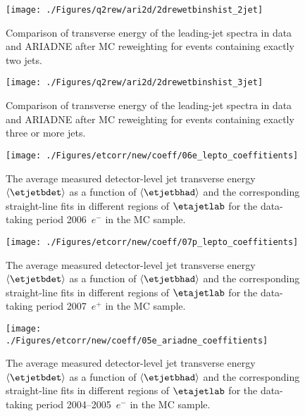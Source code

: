 \begin{figure}[p]%
\texttt{[image: ./Figures/q2rew/ari2d/2drewetbinshist\_2jet]}%
\caption{Comparison of transverse energy of the leading-jet spectra in data
and ARIADNE after MC reweighting for events containing exactly two jets.}%
\label{fig:2dq2rew_et_2jet}%
\end{figure}

\begin{figure}[p]%
\texttt{[image: ./Figures/q2rew/ari2d/2drewetbinshist\_3jet]}%
\caption{Comparison of transverse energy of the leading-jet spectra in data
and ARIADNE after MC reweighting for events containing exactly three or more jets.}%
\label{fig:2dq2rew_et_3jet}%
\end{figure}

\begin{figure}[p]
\centering
\texttt{[image: ./Figures/etcorr/new/coeff/06e\_lepto\_coeffitients]}
\caption{The average measured detector-level jet transverse energy $\left\langle\etjetbdet\right\rangle$ as a function of $\left\langle\etjetbhad\right\rangle$ and the corresponding straight-line fits in different regions of $\etajetlab$ for the data-taking period 2006~$e^-$ in the \lepto MC sample.}
\label{fig:05e_lepto_coeffitients}
\end{figure}

\begin{figure}[p]
\centering
\texttt{[image: ./Figures/etcorr/new/coeff/07p\_lepto\_coeffitients]}
\caption{The average measured detector-level jet transverse energy $\left\langle\etjetbdet\right\rangle$ as a function of $\left\langle\etjetbhad\right\rangle$ and the corresponding straight-line fits in different regions of $\etajetlab$ for the data-taking period 2007~$e^+$ in the \lepto MC sample.}
\label{fig:05e_lepto_coeffitients}
\end{figure}

\begin{figure}[p]
\centering
\texttt{[image: ./Figures/etcorr/new/coeff/05e\_ariadne\_coeffitients]}
\caption{The average measured detector-level jet transverse energy $\left\langle\etjetbdet\right\rangle$ as a function of $\left\langle\etjetbhad\right\rangle$ and the corresponding straight-line fits in different regions of $\etajetlab$ for the data-taking period 2004--2005~$e^-$ in the \ariadne MC sample.}
\label{fig:05e_lepto_coeffitients}
\end{figure}

